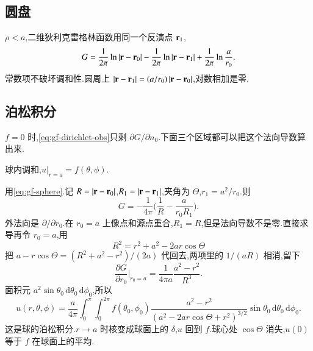 \subsection{圆盘}
$\rho<a$,二维狄利克雷格林函数用同一个反演点 ${\mathbf{r}}_1$,
\begin{equation}
  G
  =\frac{1}{2\pi}\ln|{\mathbf{r}}-{\mathbf{r}}_0|
   -\frac{1}{2\pi}\ln|{\mathbf{r}}-{\mathbf{r}}_1|
   +\frac{1}{2\pi}\ln\frac{a}{r_0}.
  \label{eq:gf-disk}
\end{equation}
常数项不破坏调和性.圆周上 $|{\mathbf{r}}-{\mathbf{r}}_1|=(a/r_0)\,|{\mathbf{r}}-{\mathbf{r}}_0|$,对数相加是零.

\subsection{泊松积分}
$f=0$ 时,\eqref{eq:gf-dirichlet-obs}只剩 $\partial G/\partial n_0$.下面三个区域都可以把这个法向导数算出来.

\begin{example}
球内调和,$u|_{r=a}=f(\theta,\phi)$.
\end{example}
\begin{solution}
用\eqref{eq:gf-sphere}.记 $R=|{\mathbf{r}}-{\mathbf{r}}_0|$,$R_1=|{\mathbf{r}}-{\mathbf{r}}_1|$,夹角为 $\Theta$,$r_1=a^2/r_0$.则
\begin{equation}
  G=-\frac{1}{4\pi}\Biggl(\frac{1}{R}-\frac{a}{r_0 R_1}\Biggr).
\end{equation}
外法向是 $\partial/\partial r_0$.在 $r_0=a$ 上像点和源点重合,$R_1=R$,但是法向导数不是零.直接求导再令 $r_0=a$,用
\begin{equation}
  R^2=r^2+a^2-2ar\cos\Theta
\end{equation}
把 $a-r\cos\Theta=(R^2+a^2-r^2)/(2a)$ 代回去,两项里的 $1/(aR)$ 相消,留下
\begin{equation}
  \frac{\partial G}{\partial r_0}\Big|_{r_0=a}
  =\frac{1}{4\pi a}\frac{a^2-r^2}{R^3}.
\end{equation}
面积元 $a^2\sin\theta_0\,\mathrm{d}\theta_0\,\mathrm{d}\phi_0$,所以
\begin{equation}
  u(r,\theta,\phi)
  =\frac{a}{4\pi}\int_0^{\pi}\int_0^{2\pi}
    f(\theta_0,\phi_0)
    \frac{a^2-r^2}{(a^2-2ar\cos\Theta+r^2)^{3/2}}
    \sin\theta_0\,\mathrm{d}\theta_0\,\mathrm{d}\phi_0.
  \label{eq:gf-poisson-sphere}
\end{equation}
这是球的泊松积分.$r\to a$ 时核变成球面上的 $\delta$,$u$ 回到 $f$.球心处 $\cos\Theta$ 消失,$u(0)$ 等于 $f$ 在球面上的平均.
\end{solution}

